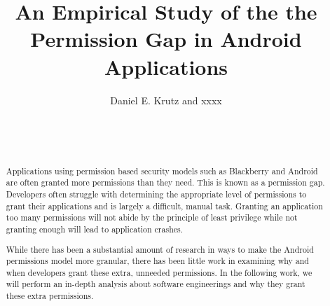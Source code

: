 \documentclass{sig-alternate}
\begin{document}

\title{An Empirical Study of the the Permission Gap in Android Applications}

%
\author{
%
%
\alignauthor
Daniel E. Krutz and xxxx\\
       \\
       \\
       \\
}


\maketitle
\begin{abstract}

Applications using permission based security models such as Blackberry and Android are often granted more permissions than they need. This is known as a permission gap. Developers often struggle with determining the appropriate level of permissions to grant their applications and is largely a difficult, manual task. Granting an application too many permissions will not abide by the principle of least privilege while not granting enough will lead to application crashes.
 
While there has been a substantial amount of research in ways to make the Android permissions model more granular, there has been little work in examining why and when developers grant these extra, unneeded permissions. In the following work, we will perform an in-depth analysis about software engineerings and why they grant these extra permissions.

\end{abstract}
\end{document}
